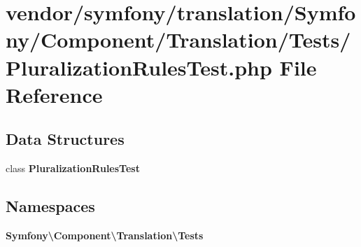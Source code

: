 \section{vendor/symfony/translation/\+Symfony/\+Component/\+Translation/\+Tests/\+Pluralization\+Rules\+Test.php File Reference}
\label{_pluralization_rules_test_8php}
\subsection*{Data Structures}
\begin{DoxyCompactItemize}
\item 
class {\bf Pluralization\+Rules\+Test}
\end{DoxyCompactItemize}
\subsection*{Namespaces}
\begin{DoxyCompactItemize}
\item 
 {\bf Symfony\textbackslash{}\+Component\textbackslash{}\+Translation\textbackslash{}\+Tests}
\end{DoxyCompactItemize}
